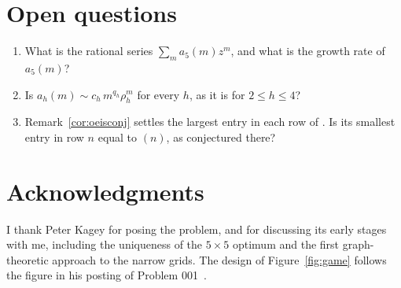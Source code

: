 \section{Open questions}\label{sec:open}

\begin{enumerate}[(1),leftmargin=*]
\item What is the rational series $\sum_m a_5(m)z^m$, and what is the growth rate
of $a_5(m)$?
\item Is $a_h(m)\sim c_h\,m^{q_h}\rho_h^m$ for every $h$, as it is for $2\le h\le4$?
\item Remark~\ref{cor:oeisconj} settles the largest entry in each row of
. Is its smallest entry in row $n$ equal to
$(n)$, as conjectured there?
\end{enumerate}

\section{Acknowledgments}\label{sec:ack}

I thank Peter Kagey for posing the problem, and for discussing its early stages
with me, including the uniqueness of the $5\times5$ optimum and the first
graph-theoretic approach to the narrow grids. The design of Figure~\ref{fig:game} follows the figure in his posting of
Problem 001~\cite{kagey001}.
